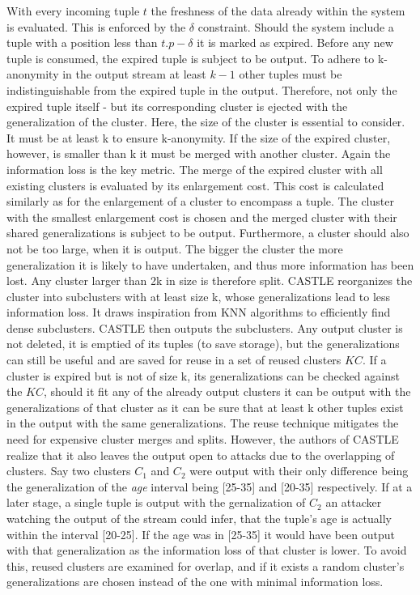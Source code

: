 \indent With every incoming tuple $t$ the freshness of the data already within the system is evaluated. This is enforced by the $\delta$ constraint. Should the system include a tuple with a position less than $t.p - \delta$ it is marked as expired. Before any new tuple is consumed, the expired tuple is subject to be output. To adhere to k-anonymity in the output stream at least $k-1$ other tuples must be indistinguishable from the expired tuple in the output. Therefore, not only the expired tuple itself - but its corresponding cluster is ejected with the generalization of the cluster. Here, the size of the cluster is essential to consider. It must be at least k to ensure k-anonymity. If the size of the expired cluster, however, is smaller than k it must be merged with another cluster. Again the information loss is the key metric. The merge of the expired cluster with all existing clusters is evaluated by its enlargement cost. This cost is calculated similarly as for the enlargement of a cluster to encompass a tuple. The cluster with the smallest enlargement cost is chosen and the merged cluster with their shared generalizations is subject to be output. Furthermore, a cluster should also not be too large, when it is output. The bigger the cluster the more generalization it is likely to have undertaken, and thus more information has been lost. Any cluster larger than 2k in size is therefore split. CASTLE reorganizes the cluster into subclusters with at least size k, whose generalizations lead to less information loss. It draws inspiration from \ac{KNN} algorithms to efficiently find dense subclusters. CASTLE then outputs the subclusters. Any output cluster is not deleted, it is emptied of its tuples (to save storage), but the generalizations can still be useful and are saved for reuse in a set of reused clusters $KC$. If a cluster is expired but is not of size k, its generalizations can be checked against the $KC$, should it fit any of the already output clusters it can be output with the generalizations of that cluster as it can be sure that at least k other tuples exist in the output with the same generalizations. The reuse technique mitigates the need for expensive cluster merges and splits. However, the authors of CASTLE realize that it also leaves the output open to attacks due to the overlapping of clusters. Say two clusters $C_1$ and $C_2$ were output with their only difference being the generalization of the \textit{age} interval being [25-35] and [20-35] respectively. If at a later stage, a single tuple is output with the gernalization of $C_2$ an attacker watching the output of the stream could infer, that the tuple's age is actually within the interval [20-25]. If the age was in [25-35] it would have been output with that generalization as the information loss of that cluster is lower. To avoid this, reused clusters are examined for overlap, and if it exists a random cluster's generalizations are chosen instead of the one with minimal information loss. \par 

